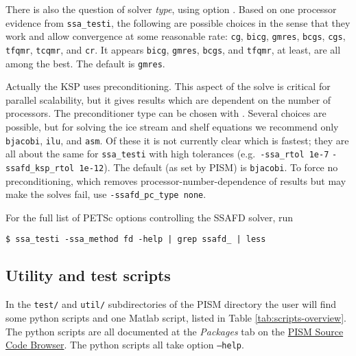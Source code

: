 There is also the question of solver \emph{type}, using option .  Based on one processor evidence from \texttt{ssa_testi}, the following are possible choices in the sense that they work and allow convergence at some reasonable rate: \texttt{cg}, \texttt{bicg}, \texttt{gmres}, \texttt{bcgs}, \texttt{cgs}, \texttt{tfqmr}, \texttt{tcqmr}, and \texttt{cr}.  It appears \texttt{bicg}, \texttt{gmres}, \texttt{bcgs}, and \texttt{tfqmr}, at least, are all among the best.  The default is \texttt{gmres}.

Actually the KSP uses preconditioning.  This aspect of the solve is critical for parallel scalability, but it gives results which are dependent on the number of processors.  The preconditioner type can be chosen with . Several choices are possible, but for solving the ice stream and shelf equations we recommend only \texttt{bjacobi}, \texttt{ilu}, and \texttt{asm}.  Of these it is not currently clear which is fastest; they are all about the same for \texttt{ssa_testi} with high tolerances (e.g.~\texttt{-ssa_rtol 1e-7} \texttt{-ssafd_ksp_rtol 1e-12}).  The default (as set by PISM) is \texttt{bjacobi}.  To force no preconditioning, which removes processor-number-dependence of results but may make the solves fail, use \texttt{-ssafd_pc_type none}.

For the full list of PETSc options controlling the SSAFD solver, run
\begin{verbatim}
$ ssa_testi -ssa_method fd -help | grep ssafd_ | less
\end{verbatim}

\subsection{Utility and test scripts} \label{subsect:scripts} In the \verb|test/| and \verb|util/| subdirectories of the PISM directory the user will find some python scripts and one Matlab script, listed in Table \ref{tab:scripts-overview}.  The python scripts are all documented at the \textsl{Packages} tab on the \href{http://www.pism-docs.org/doxy/html/index.html}{PISM Source Code Browser}.  The python scripts all take option \texttt{--help}.

\newcommand{\scripthead}[1]{\texttt{#1}}

